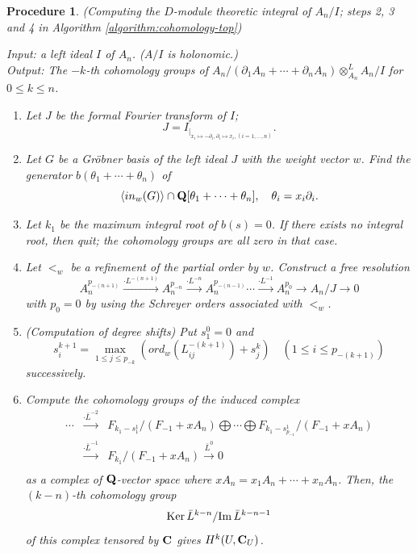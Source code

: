 \documentclass[12pt]{article}
\def\pd#1{ \partial_{#1} }
\def\C{{\bf C}}
\def\Q{{\bf Q}}
\newtheorem{procedure}[theorem]{Procedure}
\begin{document}
\begin{procedure}
\rm \label{procedure:integral}
\cite{OakuAdvance2} (Computing the $D$-module theoretic integral of $A_n/I$;
steps 2, 3 and 4 in Algorithm \ref{algorithm:cohomology-top})

\noindent
Input: a left ideal $I$ of $A_n$. ($A/I$ is holonomic.)\\
Output: The $-k$-th cohomology groups of 
$ A_n/(\pd{1} A_n + \cdots + \pd{n} A_n) \otimes_{A_n}^L A_n/I $ 
for $0 \leq k \leq n$.

		
\begin{enumerate}
\item
Let $J$ be the formal Fourier transform of $I$;
$$  J = I_{|_{ x_i \mapsto -\pd{i}, \pd{i} \mapsto x_i, (i=1, \ldots, n)}}. $$

\item  Let $G$ be a Gr\"obner basis of the left ideal $J$
with the weight vector $w$.
Find the generator
$ b(\theta_1 + \cdots + \theta_n) $
of
$$\langle in_w(G) \rangle \cap \Q[\theta_1+ \cdots + \theta_n], \quad
  \theta_i = x_i \pd{i}.
$$
\item
Let $k_1$ be the maximum integral root of $b(s)=0$.
If there exists no integral root, then quit; 
the cohomology groups are all zero in that case. 
\item
Let $<_w$ be a refinement of the partial order by $w$.
Construct a free resolution 
$$    A_n^{p_{-(n+1)}}
      \stackrel{\cdot L^{-(n+1)}}{\longrightarrow}    A_n^{p_{-n}}
      \stackrel{\cdot L^{-n}}{\longrightarrow} A_n^{p_{-(n-1)}}
      \cdots 
      \stackrel{\cdot L^{-1}}{\rightarrow} 
      A_n^{p_0} \rightarrow A_n/J \rightarrow 0
$$
with $p_0 = 0$ 
by using the Schreyer orders associated with $<_w$.  
\item (Computation of degree shifts)
Put $s_1^0 = 0$ and
$$
  s_i^{k+1} = \max_{1\leq j\leq p_{-k}}\left(
      ord_w(L^{-(k+1)}_{ij}) + s_j^k  \right) \quad (1 \leq i \leq p_{-(k+1)})
$$
successively. 
\item
Compute the cohomology groups of the induced complex 
$$
\begin{array}{ccc}
 \cdots 
 &\stackrel{\cdot {\bar L}^{-2}}{\longrightarrow}&
 F_{k_1-s_1^1}/( F_{-1} + x A_n ) \bigoplus \cdots \bigoplus
 F_{k_1-s_{p_{-1}}^1}/( F_{-1} + x A_n)          \\
&\stackrel{\cdot {\bar L}^{-1}}{\longrightarrow}&
 F_{k_1}/ ( F_{-1} + xA_n )
 \stackrel{\bar L^0}{\rightarrow} 0 \\
\end{array}
$$
as a complex of $\Q$-vector space
where $x A_n = x_1 A_n + \cdots + x_n A_n $.
Then, the $(k-n)$-th cohomology group
$$ {\rm Ker}\, {\bar L}^{k-n}/
   {\rm Im}\, {\bar L}^{k-n-1}$$
of this complex tensored by ${\bf C}$ gives 
$H^k(U,\C_U)$.
\end{enumerate}
\end{procedure}
\end{document}
